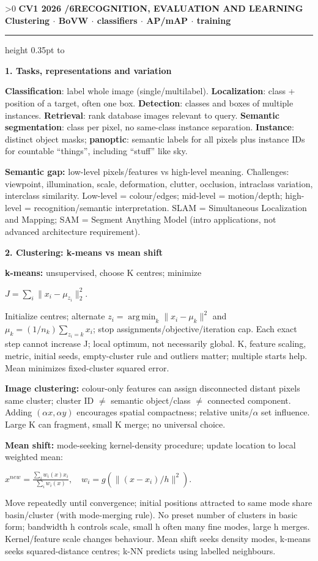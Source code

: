 \documentclass[a4paper]{article}
\newcommand{\key}[1]{\textbf{#1}}
\newcommand{\Topic}[1]{\par\vspace{1.7pt}\noindent
  {\fontsize{7.7}{8.0}\selectfont\bfseries #1}\par\vspace{0.3pt}}
\newcommand{\eq}[1]{\par\noindent\mbox{\(\displaystyle #1\)}\par}
\newcommand{\norm}[1]{\lVert #1\rVert}
\newcommand{\argmin}{\operatorname*{arg\,min}}
\newcounter{sheet}
\newcounter{sheetcolumn}
\newlength{\colwidth}
\newcommand{\Sheet}[2]{\ifnum\value{sheet}>0\newpage\fi
  \stepcounter{sheet}\setcounter{sheetcolumn}{0}
  {\fontsize{8.5}{9}\selectfont\bfseries CV1 2026 \quad \thesheet/6\quad #1
  \hfill {\fontsize{6.3}{7}\selectfont #2}}\par
  \vspace{-1pt}\hrule height 0.35pt\vspace{2pt}\noindent
  \hbox to\textwidth\bgroup\ignorespaces}
\newenvironment{sheetcol}[1][7.0]{\stepcounter{sheetcolumn}
  \begin{lrbox}{\columnbox}\begin{minipage}[t]{\colwidth}\vspace{0pt}
  \fontsize{#1}{\dimexpr#1pt+0.6pt\relax}\selectfont}
  {\end{minipage}\end{lrbox}
  \typeout{CV1COL|\thesheet|\thesheetcolumn|\the\dimexpr\ht\columnbox+\dp\columnbox\relax}
  \usebox{\columnbox}\ignorespacesafterend}
\begin{document}
\Sheet{RECOGNITION, EVALUATION AND LEARNING}{Clustering \(\cdot\) BoVW \(\cdot\) classifiers \(\cdot\) AP/mAP \(\cdot\) training}
\begin{sheetcol}
\Topic{1. Tasks, representations and variation}
\key{Classification}: label whole image (single/multilabel). \key{Localization}: class + position of a target, often one box. \key{Detection}: classes and boxes of multiple instances. \key{Retrieval}: rank database images relevant to query. \key{Semantic segmentation}: class per pixel, no same-class instance separation. \key{Instance}: distinct object masks; \key{panoptic}: semantic labels for all pixels plus instance IDs for countable ``things'', including ``stuff'' like sky.

\key{Semantic gap:} low-level pixels/features vs high-level meaning. Challenges: viewpoint, illumination, scale, deformation, clutter, occlusion, intraclass variation, interclass similarity. Low-level = colour/edges; mid-level = motion/depth; high-level = recognition/semantic interpretation. SLAM = Simultaneous Localization and Mapping; SAM = Segment Anything Model (intro applications, not advanced architecture requirement).

\Topic{2. Clustering: k-means vs mean shift}
\key{k-means:} unsupervised, choose K centres; minimize
\eq{J=\sum_i\norm{x_i-\mu_{z_i}}_2^2.}
Initialize centres; alternate \(z_i=\argmin_k\norm{x_i-\mu_k}^2\) and \(\mu_k=(1/n_k)\sum_{z_i=k}x_i\); stop assignments/objective/iteration cap. Each exact step cannot increase J; local optimum, not necessarily global. K, feature scaling, metric, initial seeds, empty-cluster rule and outliers matter; multiple starts help. Mean minimizes fixed-cluster squared error.

\key{Image clustering:} colour-only features can assign disconnected distant pixels same cluster; cluster ID \(\ne\) semantic object/class \(\ne\) connected component. Adding \((\alpha x,\alpha y)\) encourages spatial compactness; relative units/\(\alpha\) set influence. Large K can fragment, small K merge; no universal choice.

\key{Mean shift:} mode-seeking kernel-density procedure; update location to local weighted mean:
\eq{x^{new}=\frac{\sum_iw_i(x)x_i}{\sum_iw_i(x)},\quad
 w_i=g(\norm{(x-x_i)/h}^2).}
Move repeatedly until convergence; initial positions attracted to same mode share basin/cluster (with mode-merging rule). No preset number of clusters in basic form; bandwidth h controls scale, small h often many fine modes, large h merges. Kernel/feature scale changes behaviour. Mean shift seeks density modes, k-means seeks squared-distance centres; k-NN predicts using labelled neighbours.


\end{sheetcol}
\end{document}
